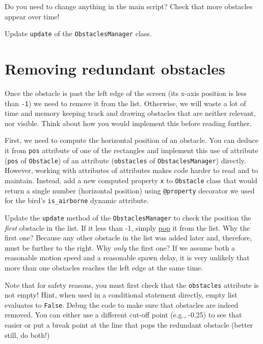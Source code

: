 \documentclass[
]{book}
\begin{document}
Do you need to change anything in the main script? Check that more obstacles appear over time!

Update \texttt{update} of the \texttt{ObstaclesManager} class.

\hypertarget{removing-redundant-obstacles}{%
\section{Removing redundant obstacles}\label{removing-redundant-obstacles}}

Once the obstacle is past the left edge of the screen (its x-axis position is less than \texttt{-1}) we need to remove it from the list. Otherwise, we will waste a lot of time and memory keeping track and drawing obstacles that are neither relevant, nor visible. Think about how you would implement this before reading further.

First, we need to compute the horizontal position of an obstacle. You can deduce it from \texttt{pos} attribute of one of the rectangles and implement this use of attribute (\texttt{pos} of \texttt{Obstacle}) of an attribute (\texttt{obstacles} of \texttt{ObstaclesManager}) directly. However, working with attributes of attributes makes code harder to read and to maintain. Instead, add a new computed property \texttt{x} to \texttt{Obstacle} class that would return a single number (horizontal position) using \texttt{@property} decorator we used for the bird's \texttt{is\_airborne} dynamic attribute.

Update the \texttt{update} method of the \texttt{ObstaclesManager} to check the position the \emph{first} obstacle in the list. If it less than -1, simply \href{https://docs.python.org/3.1/tutorial/datastructures.html}{pop} it from the list. Why the first one? Because any other obstacle in the list was added later and, therefore, must be further to the right. Why \emph{only} the first one? If we assume both a reasonable motion speed and a reasonable spawn delay, it is very unlikely that more than one obstacles reaches the left edge at the same time.

Note that for safety reasons, you must first check that the \texttt{obstacles} attribute is not empty! Hint, when used in a conditional statement directly, empty list evaluates to \texttt{False}. Debug the code to make sure that obstacles are indeed removed. You can either use a different cut-off point (e.g., -0.25) to see that easier or put a break point at the line that pops the redundant obstacle (better still, do both!)
\end{document}
